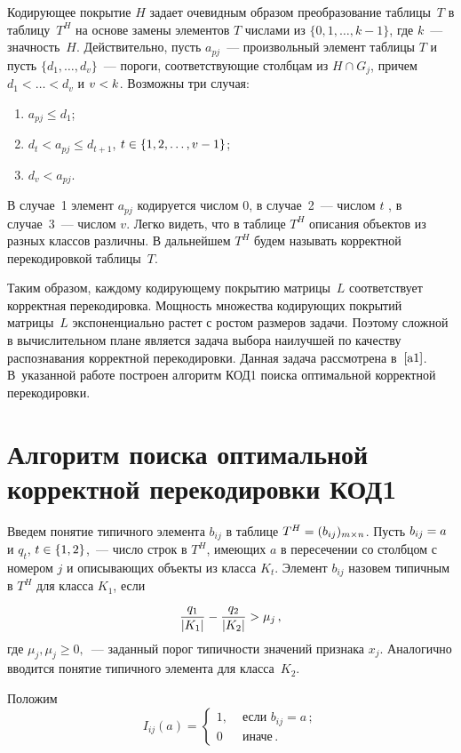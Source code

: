 \begin{multicols}{2}
\smallskip

Кодирующее покрытие $H$ задает очевидным образом преобразование
таблицы~$T$ в таблицу~$T^H$ на основе замены элементов $T$ числами
из $\{0,1,\ldots ,k-1\}$, где $k$~--- знач\-ность~$H$. Действительно, пусть
$a_{pj}$~--- произвольный элемент таблицы $T$ и пусть
$\{d_1,\ldots ,d_v\}$~--- пороги, соответствующие столбцам из $H \cap
G_j$, причем $d_1<\ldots <d_v$ и $v\hm<k$. Возможны три случая:
\begin{enumerate}[1)]
\item $a_{pj}\leq d_1$;
\item
    $d_t<a_{pj}\leq d_{t+1}$, $t\hm\in\{1,2,\ldots ,v-1\}$;
\item
    $d_v<a_{pj}$.
    \end{enumerate}

В случае~1 элемент $a_{pj}$ кодируется числом 0, в случае~2~---
числом $t$ , в случае~3~--- числом $v$. Легко видеть, что в таблице
$T^H$ описания объектов из разных классов различны. В дальнейшем
$T^H$ будем называть корректной перекодировкой таблицы~$T$.

Таким образом, каждому кодирующему покрытию матрицы~$L$
соответствует корректная перекодировка. Мощность множества
кодирующих покрытий матрицы~$L$ экспоненциально растет с ростом
размеров задачи. Поэтому сложной в вычислительном плане является
задача выбора наилучшей по качеству распознавания корректной
перекодировки. Данная задача рассмотрена в~$\cite{a1}$. В~указанной
работе построен алгоритм КОД1 поиска оптимальной корректной
перекодировки.

\section{Алгоритм поиска оптимальной корректной перекодировки КОД1}

Введем понятие типичного элемента $b_{ij}$ в таблице $T^H \hm=
(b_{ij})_{m \times n}$. Пусть $b_{ij}\hm=a$ и $q_t$, $t\hm\in \{1,2\}$,~---
число строк в $T^H$, имеющих $a$ в пересечении со столбцом с номером
$j$ и описывающих объекты из класса $K_t$. Элемент $b_{ij}$ назовем
типичным в $T^H$ для класса $K_1$, если
$$
    \displaystyle\frac{\displaystyle q_1\mathstrut}{\displaystyle |K_1|\mathstrut} - \displaystyle\frac{\displaystyle q_2\mathstrut}{\displaystyle |K_2|\mathstrut} > \mu_j\,,
$$
где $\mu_j, \mu_j \geq 0,$~--- заданный порог типичности значений
признака $x_j$. Аналогично вводится понятие типичного элемента для
класса~$K_2$.

Положим
$$
    I_{ij}(a)=
    \begin{cases}
        1, &  \mbox{ если } b_{ij}=a\,;\\
        0 &  \mbox{ иначе}\,.
    \end{cases}
$$


\end{multicols}
